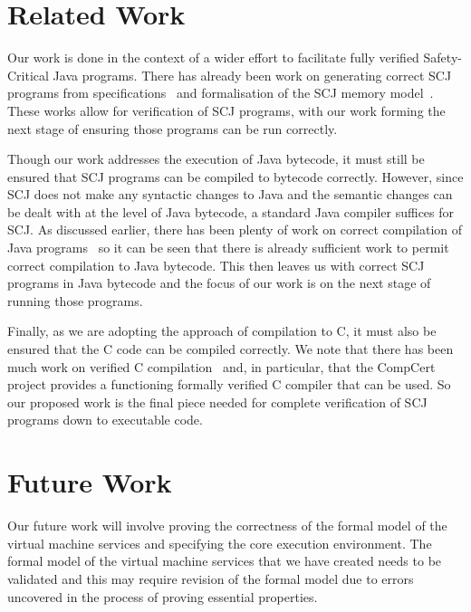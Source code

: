 \documentclass[a4paper,10pt]{report}
\begin{document}
\section{Related Work}
\label{related-work-section}

Our work is done in the context of a wider effort to facilitate fully
verified Safety-Critical Java programs.
There has already been work on generating correct SCJ programs from
\Circus{} specifications~\cite{cavalcanti2011, cavalcanti2013} and
formalisation of the SCJ memory model~\cite{cavalcanti2011a}.
These works allow for verification of SCJ programs, with our work
forming the next stage of ensuring those programs can be run
correctly.

Though our work addresses the execution of Java bytecode, it must
still be ensured that SCJ programs can be compiled to bytecode
correctly.
However, since SCJ does not make any syntactic changes to Java and the
semantic changes can be dealt with at the level of Java bytecode, a
standard Java compiler suffices for SCJ.
As discussed earlier, there has been plenty of work on correct
compilation of Java programs~\cite{klein2006, strecker2002,
  lochbihler2010, duran2005, stark2001} so it can be seen that there
is already sufficient work to permit correct compilation to Java
bytecode.
This then leaves us with correct SCJ programs in Java bytecode and the
focus of our work is on the next stage of running those programs.

Finally, as we are adopting the approach of compilation to C, it must
also be ensured that the C code can be compiled correctly.
We note that there has been much work on verified C
compilation~\cite{leroy2009a, leroy2009b, leroy2012, leinenbach2005,
  blazy2006} and, in particular, that the CompCert project provides a
functioning formally verified C compiler that can be used.
So our proposed work is the final piece needed for complete
verification of SCJ programs down to executable code.

\section{Future Work}
\label{future-work-section}

Our future work will involve proving the correctness of the formal
model of the virtual machine services and specifying the core
execution environment.
The formal model of the virtual machine services that we have created
needs to be validated and this may require revision of the formal
model due to errors uncovered in the process of proving essential
properties.
\end{document}
